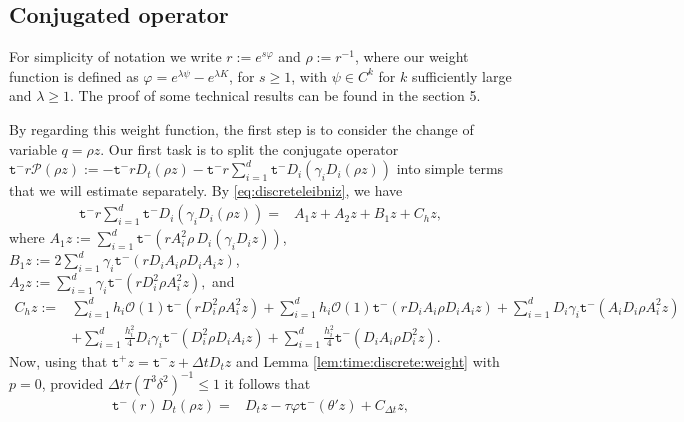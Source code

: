 \documentclass[11pt,oneside,leqno]{amsart}
\numberwithin{equation}{section}
\numberwithin{equation}{section}
\newcommand{\trp}{\mathtt t^+}
\newcommand{\trm}{\mathtt t^-}
\begin{document}
\subsection{Conjugated operator}
For simplicity of notation we write $r:=e^{s\varphi}$ and $\rho:=r^{-1}$, where our weight function is defined as $\varphi=e^{\lambda\psi}-e^{\lambda K}$, for $s\geq 1$, with $\psi\in C^{k}$ for $k$ sufficiently large and $\lambda\geq 1$. The proof of some technical results can be found in the section 5. 
\par By regarding this weight function, the first step is to consider the change of variable $q=\rho z$. Our first task is to split the conjugate operator $\trm r\mathcal{P}(\rho z):=-\trm rD_{t}(\rho z)-\trm r\sum_{i=1}^{d}\trm D_{i}\left(\gamma_{i}D_{i}(\rho z)\right)$ into simple terms that we will estimate separately. By \eqref{eq:discreteleibniz}, we have
 \begin{equation}\label{eq:conjugate}
\begin{split}
\trm r\sum_{i=1}^{d}\trm D_{i}\left(\gamma_{i}D_{i}(\rho z)\right)=&A_{1}z+A_{2}z+B_{1}z+C_{h}z,
\end{split}
\end{equation}
where $\displaystyle A_{1}z:=\sum_{i=1}^{d}\trm(rA_{i}^{2}\rho\,D_{i}(\gamma_{i}D_{i}z))$, $\displaystyle B_{1}z:=2\sum_{i=1}^{d}\gamma_{i}\trm(rD_{i}A_{i}\rho D_{i}A_{i}z)$,\\ $\displaystyle A_{2}z:=\sum_{i=1}^{d}\gamma_{i}\trm(rD_{i}^{2}\rho A_{i}^{2}z),$
and
\begin{equation*}
    \begin{split}
        C_{h}z:=&\sum_{i=1}^{d}h_{i}\mathcal{O}(1)\trm(rD_{i}^{2}\rho A_{i}^{2}z)+\sum_{i=1}^{d}h_{i}\mathcal{O}(1)\trm(rD_{i}A_{i}\rho D_{i}A_{i}z)+\sum_{i=1}^{d}D_{i}\gamma_{i}\trm(A_{i}D_{i}\rho A_{i}^{2}z)\\
        &+\sum_{i=1}^{d}\frac{h^{2}_{i}}{4}D_{i}\gamma_{i}\trm(D_{i}^{2}\rho D_{i}A_{i}z)+\sum_{i=1}^{d}\frac{h^{2}_{i}}{4}\trm(D_{i}A_{i}\rho D_{i}^{2}z).
    \end{split}
\end{equation*}
Now, using that $\trp z=\trm z+\Delta t D_{t}z$ and Lemma \ref{lem:time:discrete:weight} with $p=0$, provided $\Delta t \tau (T^3 \delta^2)^{-1}\leq 1$ it follows that
\begin{equation}\label{eq:time:conjugate}
\begin{split}
    \trm(r)\,D_{t}(\rho z)
    =&D_{t}z-\tau\varphi\trm(\theta'z)+C_{\Delta t}z,
    \end{split}
\end{equation}
\end{document}
